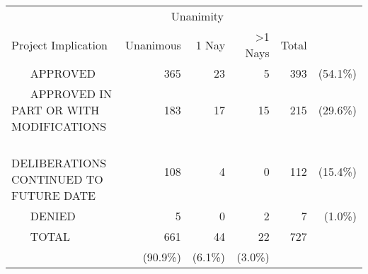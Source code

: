 \begin{tabular}{lrrrrr} \toprule
 & \multicolumn{3}{c}{Unanimity} &  & \\ 
Project Implication & Unanimous & 1 Nay & >1 Nays & Total &  \\ \midrule
~ ~ APPROVED & 365 & 23 & 5 & 393 & (54.1\%) \\ [1ex] 
~ ~ APPROVED IN PART OR WITH MODIFICATIONS & 183 & 17 & 15 & 215 & (29.6\%) \\ [1ex] 
~ ~ DELIBERATIONS CONTINUED TO FUTURE DATE & 108 & 4 & 0 & 112 & (15.4\%) \\ [1ex] 
~ ~ DENIED & 5 & 0 & 2 & 7 & (1.0\%) \\ [1ex] 
~ ~ TOTAL & 661 & 44 & 22 & 727 &  \\ [1ex] 
 & (90.9\%) & (6.1\%) & (3.0\%) &  &  \\ [1ex] 
\bottomrule
\end{tabular}
